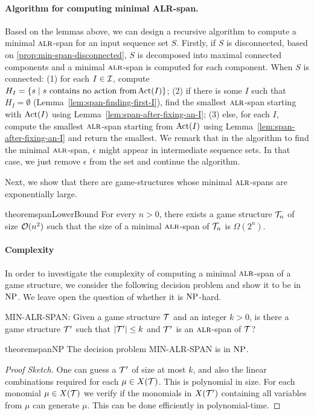 \paragraph*{Algorithm for computing minimal ALR-span.} Based on the
lemmas above, we can design a recursive algorithm to compute a minimal
$\textsc{alr}$-span for an input sequence set $S$.  
Firstly, if $S$ is disconnected, based on \cref{prop:min-span-disconnected}, $S$ is decomposed
into maximal connected components and a minimal
$\textsc{alr}$-span is computed for each component. When $S$ is connected:
(1) for each $I \in \mathcal{I}$, compute $H_I = \{ s \mid s ~\text{contains no
  action from} \operatorname{Act}(I) \}$; (2) if there is some $I$ such that $H_I =
\emptyset$ (Lemma~\ref{lem:span-finding-first-I}), find the smallest $\textsc{alr}$-span starting with $\operatorname{Act}(I)$
using Lemma~\ref{lem:span-after-fixing-an-I}; (3) else, for each $I$,
compute the smallest $\textsc{alr}$-span starting from $\operatorname{Act}(I)$ using
Lemma~\ref{lem:span-after-fixing-an-I} and return the smallest.
We remark that in the algorithm to find the minimal $\textsc{alr}$-span, $\epsilon$ might appear in intermediate sequence sets. In that case, we just remove $\epsilon$ from the set and continue the algorithm. 





                              


Next, we show that there are game-structures whose minimal
$\textsc{alr}$-spans are exponentially large.

\begin{restatable}{theorem}{spanLowerBound}\label{thm:lower-bound}
  For every $n > 0$, there exists a game structure $\mathcal{T}_n$ of size
  $\mathcal{O}(n^2)$ such that the size of a minimal $\textsc{alr}$-span of $\mathcal{T}_n$ is
  $\Omega(2^n)$.
\end{restatable}



\paragraph*{Complexity} 
In order to investigate the complexity of computing a minimal
$\textsc{alr}$-span of a game structure, we consider the following decision
problem and show it to be in $\operatorname{NP}$. We leave open the question of whether
it is $\operatorname{NP}$-hard.  

\textsc{MIN-ALR-SPAN}: Given a game structure $\mathcal{T}$ and an integer $k > 0$, is there a game structure $\mathcal{T}'$ such that $|\mathcal{T}'| \leq k$ and $\mathcal{T}'$ is an $\textsc{alr}$-span of $\mathcal{T}$?


\begin{restatable}{theorem}{spanNP}\label{thm:span-NP}
The decision problem MIN-ALR-SPAN is in $\operatorname{NP}$. 
\end{restatable}
\begin{proof}[Proof Sketch]
One can guess a $\mathcal{T}'$ of size at most $k$, and also the linear
combinations required for each $\mu \in X(\mathcal{T})$. This is polynomial in
size. For each monomial $\mu \in X(\mathcal{T})$ we verify if the monomials in
$X(\mathcal{T}')$ containing all variables from $\mu$ can generate $\mu$. This
can be done efficiently in polynomial-time. \qedhere \end{proof}






